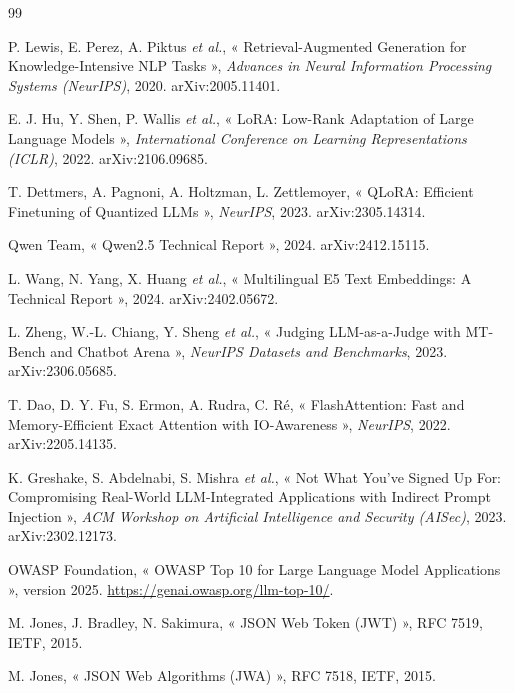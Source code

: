 \documentclass[12pt,a4paper]{report}
\begin{document}
\begin{thebibliography}{99}

 P. Lewis, E. Perez, A. Piktus \emph{et al.}, « Retrieval-Augmented Generation for
Knowledge-Intensive NLP Tasks », \emph{Advances in Neural Information Processing Systems (NeurIPS)}, 2020.
arXiv:2005.11401.

 E. J. Hu, Y. Shen, P. Wallis \emph{et al.}, « LoRA: Low-Rank Adaptation of Large
Language Models », \emph{International Conference on Learning Representations (ICLR)}, 2022.
arXiv:2106.09685.

 T. Dettmers, A. Pagnoni, A. Holtzman, L. Zettlemoyer, « QLoRA: Efficient
Finetuning of Quantized LLMs », \emph{NeurIPS}, 2023. arXiv:2305.14314.

 Qwen Team, « Qwen2.5 Technical Report », 2024. arXiv:2412.15115.

 L. Wang, N. Yang, X. Huang \emph{et al.}, « Multilingual E5 Text Embeddings: A
Technical Report », 2024. arXiv:2402.05672.

 L. Zheng, W.-L. Chiang, Y. Sheng \emph{et al.}, « Judging LLM-as-a-Judge with
MT-Bench and Chatbot Arena », \emph{NeurIPS Datasets and Benchmarks}, 2023. arXiv:2306.05685.

 T. Dao, D. Y. Fu, S. Ermon, A. Rudra, C. Ré, « FlashAttention: Fast and
Memory-Efficient Exact Attention with IO-Awareness », \emph{NeurIPS}, 2022. arXiv:2205.14135.

 K. Greshake, S. Abdelnabi, S. Mishra \emph{et al.}, « Not What You've Signed Up
For: Compromising Real-World LLM-Integrated Applications with Indirect Prompt Injection »,
\emph{ACM Workshop on Artificial Intelligence and Security (AISec)}, 2023. arXiv:2302.12173.

 OWASP Foundation, « OWASP Top 10 for Large Language Model Applications », version 2025.
\url{https://genai.owasp.org/llm-top-10/}.

 M. Jones, J. Bradley, N. Sakimura, « JSON Web Token (JWT) », RFC 7519, IETF, 2015.

 M. Jones, « JSON Web Algorithms (JWA) », RFC 7518, IETF, 2015.


\end{thebibliography}
\end{document}

